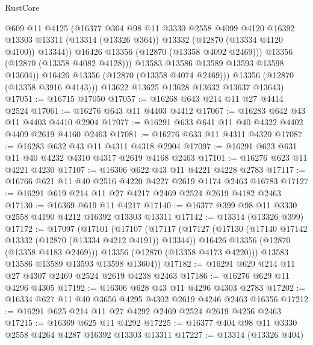 \begin{lexlean}{RustCore}
\begin{coremodule}
                    @609
                    @11
                    @4125
                    (@16377
                      @364
                      @98
                      @11
                      @3330
                      @2558
                      @4099
                      @4120
                      @16392
                      @13303
                      @13311
                      (@13314 (@13326 @364))
                      @13332
                      (@12870 (@13334 @4120 @4100))
                      @13344))
                  @16426
                  @13356
                  (@12870 (@13358 @4092 @2469)))
                @13356
                (@12870 (@13358 @4082 @4128)))
              @13583
              @13586
              @13589
              @13593
              @13598
              @13604))
          @16426
          @13356
          (@12870 (@13358 @4074 @2469)))
        @13356
        (@12870 (@13358 @3916 @4143)))
      @13622
      @13625
      @13628
      @13632
      @13637
      @13643)
@17051 := @16715 @17050
@17057 := @16268 @643 @214 @11 @27 @4414 @2524
@17061 := @16276 @643 @11 @4403 @4412
@17067 := @16283 @642 @43 @11 @4403 @4410 @2904
@17077 := @16291 @633 @641 @11 @40 @4322 @4402 @4409 @2619 @4160 @2463
@17081 := @16276 @633 @11 @4311 @4320
@17087 := @16283 @632 @43 @11 @4311 @4318 @2904
@17097 := @16291 @623 @631 @11 @40 @4232 @4310 @4317 @2619 @4168 @2463
@17101 := @16276 @623 @11 @4221 @4230
@17107 := @16306 @622 @43 @11 @4221 @4228 @2783
@17117 := @16766 @621 @11 @40 @2516 @4220 @4227 @2619 @1174 @2463 @16783
@17127 := @16291 @619 @214 @11 @27 @4217 @2469 @2524 @2619 @4182 @2463
@17130 := @16369 @619 @11 @4217
@17140 := @16377 @399 @98 @11 @3330 @2558 @4190 @4212 @16392 @13303 @13311
@17142 := @13314 (@13326 @399)
@17172 := @17097
    (@17101
      (@17107
        (@17117
          (@17127
            (@17130 (@17140 @17142 @13332 (@12870 (@13334 @4212 @4191)) @13344))
            @16426
            @13356
            (@12870 (@13358 @4183 @2469)))
          @13356
          (@12870 (@13358 @4173 @4220)))
        @13583
        @13586
        @13589
        @13593
        @13598
        @13604))
@17182 := @16291 @629 @214 @11 @27 @4307 @2469 @2524 @2619 @4238 @2463
@17186 := @16276 @629 @11 @4296 @4305
@17192 := @16306 @628 @43 @11 @4296 @4303 @2783
@17202 := @16334 @627 @11 @40 @3656 @4295 @4302 @2619 @4246 @2463 @16356
@17212 := @16291 @625 @214 @11 @27 @4292 @2469 @2524 @2619 @4256 @2463
@17215 := @16369 @625 @11 @4292
@17225 := @16377 @404 @98 @11 @3330 @2558 @4264 @4287 @16392 @13303 @13311
@17227 := @13314 (@13326 @404)

\end{coremodule}
\end{lexlean}
